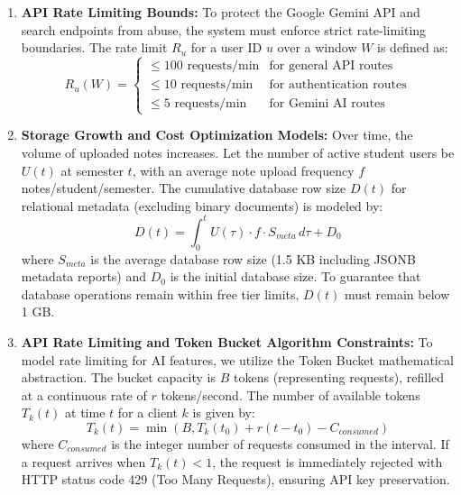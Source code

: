 \documentclass[12,Times new Roman,a4paper]{report}
\begin{document}
\begin{enumerate}
    \item \textbf{API Rate Limiting Bounds:} To protect the Google Gemini API and search endpoints from abuse, the system must enforce strict rate-limiting boundaries. The rate limit $R_u$ for a user ID $u$ over a window $W$ is defined as:
    \begin{equation}
    R_u(W) = \begin{cases}
    \le 100\text{ requests/min} & \text{for general API routes} \\
    \le 10\text{ requests/min} & \text{for authentication routes} \\
    \le 5\text{ requests/min} & \text{for Gemini AI routes}
    \end{cases}
    \end{equation}
    
    \item \textbf{Storage Growth and Cost Optimization Models:} Over time, the volume of uploaded notes increases. Let the number of active student users be $U(t)$ at semester $t$, with an average note upload frequency $f$ notes/student/semester. The cumulative database row size $D(t)$ for relational metadata (excluding binary documents) is modeled by:
    \begin{equation}
    D(t) = \int_{0}^{t} U(\tau) \cdot f \cdot S_{meta} \, d\tau + D_0
    \end{equation}
    where $S_{meta}$ is the average database row size (1.5 KB including JSONB metadata reports) and $D_0$ is the initial database size. To guarantee that database operations remain within free tier limits, $D(t)$ must remain below 1 GB.
    
    \item \textbf{API Rate Limiting and Token Bucket Algorithm Constraints:} To model rate limiting for AI features, we utilize the Token Bucket mathematical abstraction. The bucket capacity is $B$ tokens (representing requests), refilled at a continuous rate of $r$ tokens/second. The number of available tokens $T_k(t)$ at time $t$ for a client $k$ is given by:
    \begin{equation}
    T_k(t) = \min(B, T_k(t_0) + r(t - t_0) - C_{consumed})
    \end{equation}
    where $C_{consumed}$ is the integer number of requests consumed in the interval. If a request arrives when $T_k(t) < 1$, the request is immediately rejected with HTTP status code 429 (Too Many Requests), ensuring API key preservation.
    

\end{enumerate}
\end{document}
